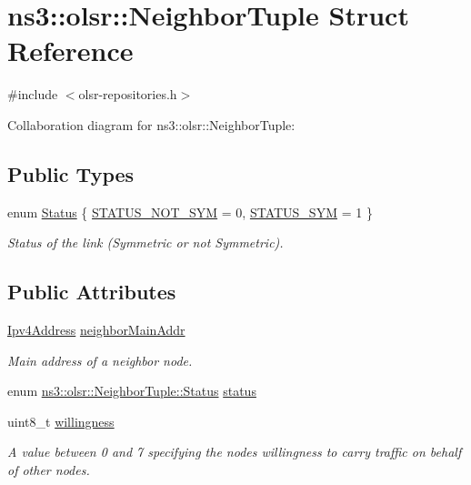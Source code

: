 \hypertarget{structns3_1_1olsr_1_1NeighborTuple}{}\section{ns3\+:\+:olsr\+:\+:Neighbor\+Tuple Struct Reference}
\label{structns3_1_1olsr_1_1NeighborTuple}


{\ttfamily \#include $<$olsr-\/repositories.\+h$>$}



Collaboration diagram for ns3\+:\+:olsr\+:\+:Neighbor\+Tuple\+:
\subsection*{Public Types}
\begin{DoxyCompactItemize}
\item 
enum \hyperlink{structns3_1_1olsr_1_1NeighborTuple_ad4b623edaedb3a5244291c738ce87e12}{Status} \{ \hyperlink{structns3_1_1olsr_1_1NeighborTuple_ad4b623edaedb3a5244291c738ce87e12ab633cfd28c2ec5d1f2b6deec3c7ebcf9}{S\+T\+A\+T\+U\+S\+\_\+\+N\+O\+T\+\_\+\+S\+YM} = 0, 
\hyperlink{structns3_1_1olsr_1_1NeighborTuple_ad4b623edaedb3a5244291c738ce87e12a1649b9e4d61ac6e27eff65e8bd5dfe15}{S\+T\+A\+T\+U\+S\+\_\+\+S\+YM} = 1
 \}\begin{DoxyCompactList}\small\item\em Status of the link (Symmetric or not Symmetric). \end{DoxyCompactList}
\end{DoxyCompactItemize}
\subsection*{Public Attributes}
\begin{DoxyCompactItemize}
\item 
\hyperlink{classns3_1_1Ipv4Address}{Ipv4\+Address} \hyperlink{structns3_1_1olsr_1_1NeighborTuple_a440b6b245ad919cd4023836246519106}{neighbor\+Main\+Addr}
\begin{DoxyCompactList}\small\item\em Main address of a neighbor node. \end{DoxyCompactList}\item 
enum \hyperlink{structns3_1_1olsr_1_1NeighborTuple_ad4b623edaedb3a5244291c738ce87e12}{ns3\+::olsr\+::\+Neighbor\+Tuple\+::\+Status} \hyperlink{structns3_1_1olsr_1_1NeighborTuple_a893b70912d3bd7b437b493e4cb09f738}{status}
\item 
uint8\+\_\+t \hyperlink{structns3_1_1olsr_1_1NeighborTuple_a96d469ddecd638d7eb524de3bcd79edf}{willingness}
\begin{DoxyCompactList}\small\item\em A value between 0 and 7 specifying the node\textquotesingle{}s willingness to carry traffic on behalf of other nodes. \end{DoxyCompactList}\end{DoxyCompactItemize}


